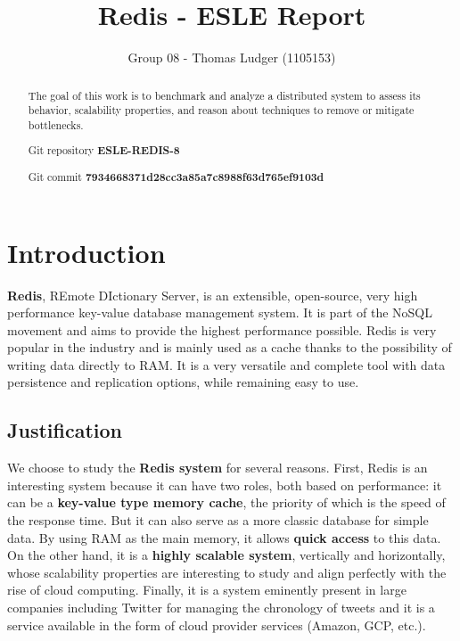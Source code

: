 \documentclass[runningheads]{llncs}
\begin{document}
\title{Redis - ESLE Report}
\author{Group 08 - Thomas Ludger (1105153)}
\maketitle
\begin{abstract}
The goal of this work is to benchmark and analyze a distributed system to assess its behavior, scalability properties, and reason about techniques to remove or mitigate bottlenecks.

Git repository \textbf{ESLE-REDIS-8}

Git commit \textbf{7934668371d28cc3a85a7c8988f63d765ef9103d}

\end{abstract}

\section{Introduction}
\textbf{Redis}, REmote DIctionary Server, is an extensible, open-source, very high performance key-value database management system. It is part of the NoSQL movement and aims to provide the highest performance possible. Redis is very popular in the industry and is mainly used as a cache thanks to the possibility of writing data directly to RAM. It is a very versatile and complete tool with data persistence and replication options, while remaining easy to use.

\subsection{Justification}
We choose to study the \textbf{Redis system} for several reasons. First, Redis is an interesting system because it can have two roles, both based on performance: it can be a \textbf{key-value type memory cache}, the priority of which is the speed of the response time. But it can also serve as a more classic database for simple data. By using RAM as the main memory, it allows \textbf{quick access} to this data.
On the other hand, it is a \textbf{highly scalable system}, vertically and horizontally, whose scalability properties are interesting to study and align perfectly with the rise of cloud computing.
Finally, it is a system eminently present in large companies including Twitter for managing the chronology of tweets and it is a service available in the form of cloud provider services (Amazon, GCP, etc.).
\end{document}
